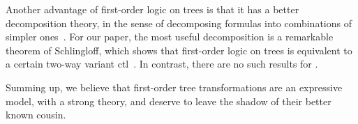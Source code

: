 Another advantage of first-order logic on trees is that it has a better decomposition theory, in the sense of decomposing formulas into combinations of simpler ones~\cite{haferthomas,bojanczykDecidablePropertiesTree2004,esik-weil1}. 
For our paper, the most useful decomposition is a remarkable theorem of Schlingloff, which shows that first-order logic on trees is equivalent to a certain two-way variant  {\sc ctl}~\cite[Theorem 4.5]{schlingloff1992expressive}. In contrast, there are no such results for \mso. 



Summing up, we believe that first-order  tree transformations are an expressive model, with a strong theory, and deserve to leave the shadow of their better known \mso cousin.


